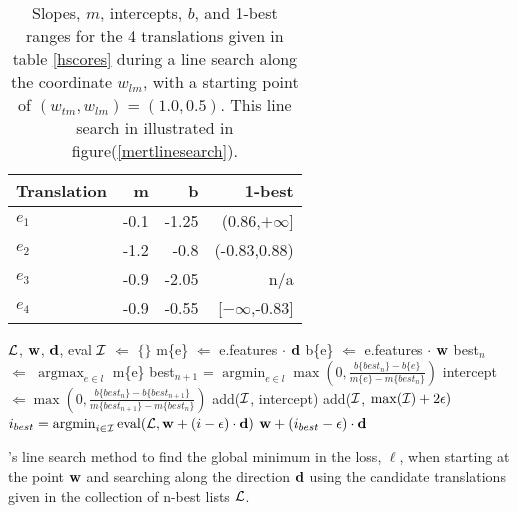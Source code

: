 \documentclass[11pt]{article}
\DeclareMathOperator*{\argmax}{argmax}
\DeclareMathOperator*{\argmin}{argmin}
\DeclareMathOperator*{\eval}{eval}
\begin{document}
\begin{table}
\begin{center}
\begin{tabular}{|l|rrr|}
\hline \bf Translation  & \bf m  & \bf b & \bf 1-best  \\
\hline
$e_1$     & -0.1 & -1.25  & (0.86,$+\infty$] \\
$e_2$     & -1.2 & -0.8   & (-0.83,0.88) \\
$e_3$     & -0.9 & -2.05  & n/a \\
$e_4$     & -0.9 & -0.55  & [$-\infty$,-0.83] \\
\hline
\end{tabular}
\end{center}
\caption{Slopes, $m$, intercepts, $b$, and 1-best ranges for the 4 translations given in table \ref{hscores} during a line search along the coordinate $w_{lm}$, with a starting point of $(w_{tm}, w_{lm}) = (1.0, 0.5)$. This line search in illustrated in figure(\ref{mertlinesearch}).
\label{hlinesearch}
}
\end{table}

\begin{algorithm}[tb]
\begin{algorithmic}
    ${\cal L}$, ${\bf w}$, ${\bf d}$, eval
   \STATE ${\cal I}$ $\Leftarrow$ $\{\}$
         \STATE m\{e\} $\Leftarrow$ e.features $\cdot$ ${\bf d}$
         \STATE b\{e\} $\Leftarrow$ e.features $\cdot$ ${\bf w}$
     \ENDFOR
     \STATE best$_n$ $\Leftarrow$ $\argmax_{e\in l}$ m\{e\}
     \LOOP
       \STATE best$_{n+1}$ = $\argmin_{e\in l}
                  \max\left(0,\frac{b\{best_n\}-b\{e\}}{m\{e\}-m\{best_n\}}\right )$
       \STATE intercept $\Leftarrow \max\left(0,\frac{b\{best_n\}-b\{best_{n+1}\}}{m\{best_{n+1}\}-m\{best_n\}}\right )$
         \STATE add(${\cal I}$, intercept)
       \ELSE
       \ENDIF
     \ENDLOOP
   \ENDFOR
   \STATE add(${\cal I}$, $\max({\cal I})+2\epsilon)$
   \STATE $i_{best} = \argmin_{i \in {\cal I}} \eval({\cal L},{\bf w}+(i-\epsilon) \cdot {\bf d})$
    ${\bf w}+(i_{best}-\epsilon) \cdot {\bf d}$
\caption{
's line search method to find the global minimum in the loss, ${\ell}$, when starting at the point ${\bf w}$ and searching along the direction ${\bf d}$ using the candidate translations given in the collection of n-best lists ${\cal L}$.
\label{mertlinesearchalg}
}
\end{algorithmic}
\end{algorithm}
\end{document}
